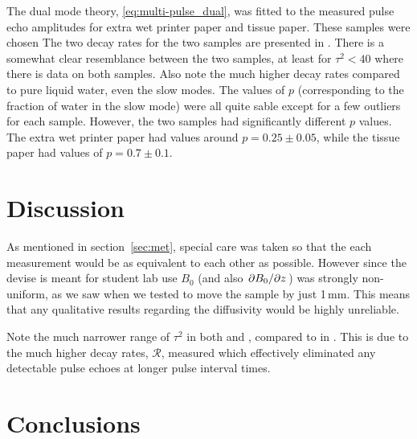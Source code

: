 \documentclass[11pt,a4paper, twocolumn,
swedish, english %
]{article}
\begin{document}
The dual mode theory, \eqref{eq:multi-pulse_dual}, was fitted to the
measured pulse echo amplitudes for extra wet printer paper and tissue
paper. These samples were chosen 
The two decay rates for the two samples are presented in
. There is a somewhat clear resemblance between
the two samples, at least for $\tau^2<40$ where there is data on both
samples. Also note the much higher decay rates compared to pure liquid
water, even the slow modes. The values of $p$ (corresponding to the
fraction of water in the slow mode) were all quite sable except for a
few outliers for each sample. However, the two samples had
significantly different $p$ values. The extra wet printer paper had
values around $p=0.25\pm0.05$, while the tissue paper had values of 
$p=0.7\pm0.1$.


\section{Discussion}



As mentioned in section~\ref{sec:met}, special care was taken so that
the each measurement would be as equivalent to each other as
possible. However since the devise is meant for student lab use $B_0$
(and also $\pdv*{B_0}{z}$) was strongly non-uniform, as we saw when we
tested to move the sample by just 1\,mm. This means that any
qualitative results regarding the diffusivity would be highly
unreliable. 



Note the much narrower range of $\tau^2$ in both  and
, compared to in . This is
due to the much higher decay rates, $\mathcal{R}$, measured which
effectively eliminated any detectable pulse echoes at longer pulse
interval times. 




\section{Conclusions}
\end{document}
